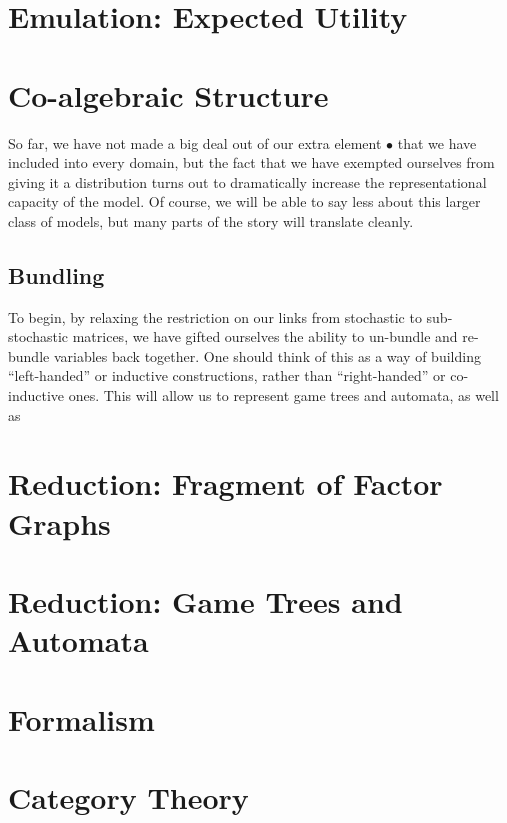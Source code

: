 \documentclass{article}
\begin{document}
	\section{Emulation: Expected Utility}
	
	
	\section{Co-algebraic Structure}
	So far, we have not made a big deal out of our extra element $\bullet$ that we have included into every domain, but the fact that we have exempted ourselves from giving it a distribution turns out to dramatically increase the representational capacity of the model. Of course, we will be able to say less about this larger class of models, but many parts of the story will translate cleanly.
	
	\subsection{Bundling} 
	To begin, by relaxing the restriction on our links from stochastic to sub-stochastic matrices, we have gifted ourselves the ability to un-bundle and re-bundle variables back together. One should think of this as a way of building ``left-handed'' or inductive constructions, rather than ``right-handed'' or co-inductive ones. This will allow us to represent game trees and automata, as well as
	
	\begin{center}
		\begin{tikzpicture}
		
		\end{tikzpicture}
	\end{center}

	


	\section{Reduction: Fragment of Factor Graphs}
	\section{Reduction: Game Trees and Automata}
	\section{Formalism}


	\section{Category Theory}
\end{document}
